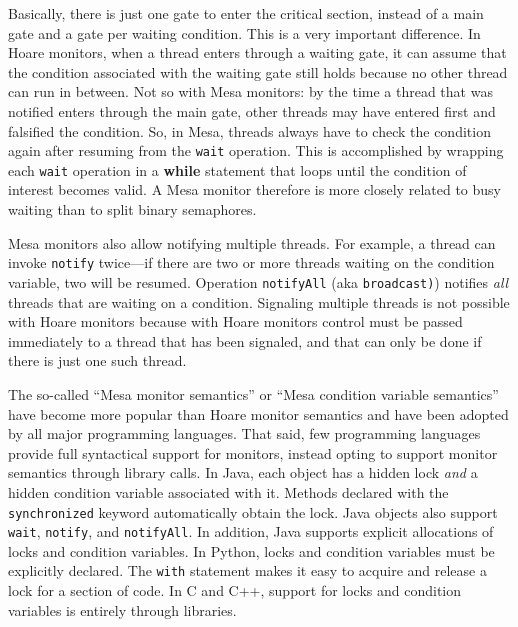 \documentclass{report}
\begin{document}
Basically, there is just one gate to enter the critical section, instead
of a main gate and a gate per waiting condition.
This is a very important difference.  In Hoare monitors, when a thread
enters through a waiting gate, it can assume that the condition associated
with the waiting gate still holds because no other thread can run in between.
Not so with Mesa monitors: by the time a thread that was notified enters
through the main gate, other threads may have entered first and falsified
the condition.  So, in Mesa, threads always have to check the condition
again after resuming from the \texttt{wait} operation.  This is accomplished
by wrapping each \texttt{wait} operation in a \textbf{while} statement that
loops until the condition of interest becomes valid.
A Mesa monitor therefore is more closely related to busy waiting
than to split binary semaphores.

Mesa monitors also allow notifying multiple threads.
For example, a thread can invoke \texttt{notify} twice---if there are
two or more threads waiting on the condition variable, two will be resumed.
Operation \texttt{notifyAll}
%
(aka \texttt{broadcast)})
%
notifies \emph{all} threads that are waiting
on a condition.
Signaling multiple threads is not possible with Hoare monitors because with
Hoare monitors control
must be passed immediately to a thread that has been signaled, and that
can only be done if there is just one such thread.

The so-called
``Mesa monitor semantics'' or ``Mesa condition variable semantics''
have become more popular than Hoare monitor semantics and have been
adopted by all major programming languages.
That said, few programming languages provide full syntactical support
for monitors, instead opting to support monitor semantics through library
calls.
In Java, each object has a hidden lock \emph{and} a hidden condition variable
associated with it.
Methods declared with the \texttt{synchronized} keyword automatically
obtain the lock.  Java objects also support \texttt{wait}, \texttt{notify},
and \texttt{notifyAll}.
In addition, Java supports explicit allocations of locks
and condition variables.
In Python, locks and condition variables must be explicitly declared.
The \texttt{with} statement makes it easy to acquire and release a lock
for a section of code.
In C and C++, support for locks and condition variables is entirely
through libraries.

\end{document}
